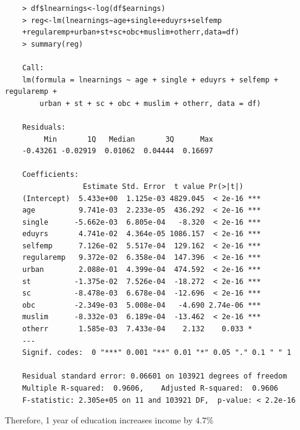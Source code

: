 \documentclass[notoc]{tufte-book}
\begin{document}
\begin{lstlisting}
    > df$lnearnings<-log(df$earnings)
    > reg<-lm(lnearnings~age+single+eduyrs+selfemp
    +regularemp+urban+st+sc+obc+muslim+otherr,data=df)
    > summary(reg)
    
    Call:
    lm(formula = lnearnings ~ age + single + eduyrs + selfemp + regularemp + 
        urban + st + sc + obc + muslim + otherr, data = df)
    
    Residuals:
         Min       1Q   Median       3Q      Max 
    -0.43261 -0.02919  0.01062  0.04444  0.16697 
    
    Coefficients:
                  Estimate Std. Error  t value Pr(>|t|)    
    (Intercept)  5.433e+00  1.125e-03 4829.045  < 2e-16 ***
    age          9.741e-03  2.233e-05  436.292  < 2e-16 ***
    single      -5.662e-03  6.805e-04   -8.320  < 2e-16 ***
    eduyrs       4.741e-02  4.364e-05 1086.157  < 2e-16 ***
    selfemp      7.126e-02  5.517e-04  129.162  < 2e-16 ***
    regularemp   9.372e-02  6.358e-04  147.396  < 2e-16 ***
    urban        2.088e-01  4.399e-04  474.592  < 2e-16 ***
    st          -1.375e-02  7.526e-04  -18.272  < 2e-16 ***
    sc          -8.478e-03  6.678e-04  -12.696  < 2e-16 ***
    obc         -2.349e-03  5.008e-04   -4.690 2.74e-06 ***
    muslim      -8.332e-03  6.189e-04  -13.462  < 2e-16 ***
    otherr       1.585e-03  7.433e-04    2.132    0.033 *  
    ---
    Signif. codes:  0 "***" 0.001 "**" 0.01 "*" 0.05 "." 0.1 " " 1
    
    Residual standard error: 0.06601 on 103921 degrees of freedom
    Multiple R-squared:  0.9606,	Adjusted R-squared:  0.9606 
    F-statistic: 2.305e+05 on 11 and 103921 DF,  p-value: < 2.2e-16
\end{lstlisting}
Therefore, 1 year of education increases income by $4.7 \%$
\end{document}

